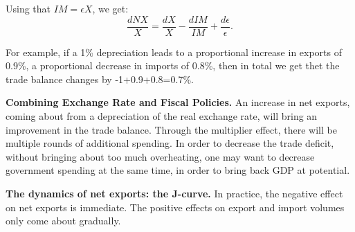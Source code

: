 \documentclass[]{book}
\theoremstyle{definition}
\theoremstyle{definition}
\theoremstyle{definition}
\theoremstyle{remark}
\begin{document}
Using that \(IM=\epsilon X\), we get:
\[\boxed{\frac{dNX}{X}=\frac{dX}{X}-\frac{dIM}{IM}+\frac{d\epsilon}{\epsilon}}.\]

For example, if a 1\% depreciation leads to a proportional increase in
exports of 0.9\%, a proportional decrease in imports of 0.8\%, then in
total we get thet the trade balance changes by -1+0.9+0.8=0.7\%.

\textbf{Combining Exchange Rate and Fiscal Policies.} An increase in net
exports, coming about from a depreciation of the real exchange rate,
will bring an improvement in the trade balance. Through the multiplier
effect, there will be multiple rounds of additional spending. In order
to decrease the trade deficit, without bringing about too much
overheating, one may want to decrease government spending at the same
time, in order to bring back GDP at potential.

\textbf{The dynamics of net exports: the J-curve.} In practice, the
negative effect on net exports is immediate. The positive effects on
export and import volumes only come about gradually.


\end{document}
